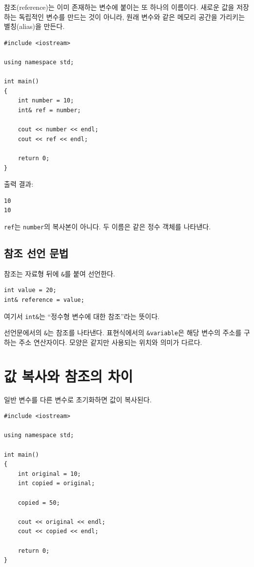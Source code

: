 \documentclass[11pt,a4paper]{article}
\begin{document}
참조(reference)는 이미 존재하는 변수에 붙이는 또 하나의 이름이다.
새로운 값을 저장하는 독립적인 변수를 만드는 것이 아니라, 원래 변수와 같은 메모리 공간을 가리키는 별칭(alias)을 만든다.

\begin{lstlisting}
#include <iostream>

using namespace std;

int main()
{
    int number = 10;
    int& ref = number;

    cout << number << endl;
    cout << ref << endl;

    return 0;
}
\end{lstlisting}

출력 결과:

\begin{verbatim}
10
10
\end{verbatim}

\texttt{ref}는 \texttt{number}의 복사본이 아니다.
두 이름은 같은 정수 객체를 나타낸다.

\subsection{참조 선언 문법}

참조는 자료형 뒤에 \texttt{\&}를 붙여 선언한다.

\begin{lstlisting}
int value = 20;
int& reference = value;
\end{lstlisting}

여기서 \texttt{int\&}는 ``정수형 변수에 대한 참조''라는 뜻이다.

\begin{importantbox}
선언문에서의 \texttt{\&}는 참조를 나타낸다.
표현식에서의 \texttt{\&variable}은 해당 변수의 주소를 구하는 주소 연산자이다.
모양은 같지만 사용되는 위치와 의미가 다르다.
\end{importantbox}

\section{값 복사와 참조의 차이}

일반 변수를 다른 변수로 초기화하면 값이 복사된다.

\begin{lstlisting}
#include <iostream>

using namespace std;

int main()
{
    int original = 10;
    int copied = original;

    copied = 50;

    cout << original << endl;
    cout << copied << endl;

    return 0;
}
\end{lstlisting}
\end{document}
